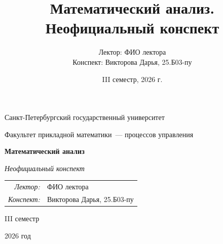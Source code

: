 \documentclass[12pt,a4paper]{report}
\title{Математический анализ. Неофициальный конспект}
\author{Лектор: ФИО лектора\\
Конспект: Викторова Дарья, 25.Б03-пу}
\date{III семестр, 2026 г.}
\begin{document}
\begin{titlepage}
    \thispagestyle{empty}
    \begin{center}
        \vspace*{0.6cm}

        {\large Санкт-Петербургский государственный университет\par}
        \vspace{0.35em}
        {\normalsize Факультет прикладной математики~--- процессов управления\par}

        \vspace*{5.1cm}

        {\fontsize{30}{35}\selectfont\bfseries Математический анализ\par}
        \vspace{0.65em}
        {\fontsize{17}{21}\selectfont\itshape Неофициальный конспект\par}

        \vspace{2.7cm}

        {\normalsize
        \begin{tabular}{@{}rl@{}}
            \textit{Лектор:} & ФИО лектора \\
            \textit{Конспект:} & Викторова Дарья, 25.Б03-пу
        \end{tabular}\par}

        \vfill

        {\large III семестр\par}
        \vspace{0.22em}
        {\large 2026 год\par}
        \vspace*{0.55cm}
    \end{center}
\end{titlepage}

\tableofcontents
\newpage

\setcounter{lection}{0}

\end{document}
